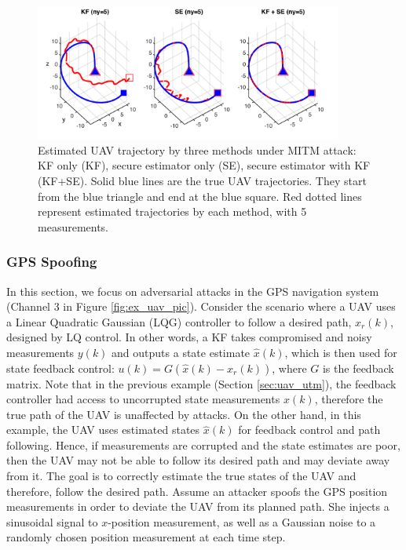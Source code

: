 \documentclass[../../thesis.tex]{subfiles}
\begin{document}
\begin{figure}
\center
\includegraphics[width=0.9\textwidth]{chapters/se_linear/figures/qh/uav_lq_traj}
\caption{Estimated UAV trajectory by three methods under MITM attack: KF only (KF), secure estimator only (SE), secure estimator with KF (KF+SE). Solid blue lines are the true UAV trajectories. They start from the blue triangle and end at the blue square. Red dotted lines represent estimated trajectories by each method, with 5 measurements.}
\label{fig:ex_uav_remote}
\end{figure}

\subsubsection{GPS Spoofing}

In this section, we focus on adversarial attacks in the GPS navigation system (Channel 3 in Figure \ref{fig:ex_uav_pic}). Consider the scenario where a UAV uses a Linear Quadratic Gaussian (LQG) controller to follow a desired path, $x_r(k)$, designed by LQ control. In other words, a KF takes compromised and noisy measurements $y(k)$ and outputs a state estimate $\hat x(k)$, which is then used for state feedback control: $u(k) = G (\hat x(k) - x_r(k))$, where $G$ is the feedback matrix. Note that in the previous example (Section \ref{sec:uav_utm}), the feedback controller had access to uncorrupted state measurements $x(k)$, therefore the true path of the UAV is unaffected by attacks. On the other hand, in this example, the UAV uses estimated states $\hat x(k)$ for feedback control and path following. Hence, if measurements are corrupted and the state estimates are poor, then the UAV may not be able to follow its desired path and may deviate away from it. The goal is to correctly estimate the true states of the UAV and therefore, follow the desired path. Assume an attacker spoofs the GPS position measurements in order to deviate the UAV from its planned path. She injects a sinusoidal signal to $x$-position measurement, as well as a Gaussian noise to a randomly chosen position measurement at each time step. 
\end{document}
